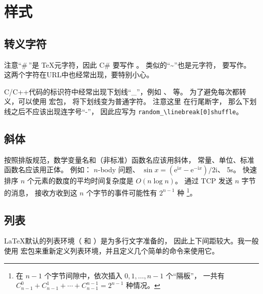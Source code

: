\chapter{样式}

\section{转义字符}
注意“\#\,”是 \TeX 元字符，因此 C\# 要写作 。
类似的“\textasciitilde”也是元字符，
要写作。
这两个字符在URL中也经常出现，要特别小心。

C/C++代码的标识符中经常出现下划线“_”，例如 、
 等。
为了避免每次都转义，可以使用  宏包，
将下划线变为普通字符。
注意这里  在行尾断字，
那么下划线之后不应该出现连字号“-”，
因此应写为 \verb|random_\linebreak[0]shuffle|。

\section{斜体}
按照排版规范，数学变量名和（非标准）函数名应该用斜体，
常量、单位、标准函数名应该用正体。
例如：%
$n$-body 问题、%
$\sin x = (\mathrm{e}^{\mathrm{i}x} - \mathrm{e}^{-\mathrm{i}x})/2\mathrm{i}$、
5\textmu s。
快速排序 $n$ 个元素的数度的平均时间复杂度是 $O(n \log n)$。
通过 TCP 发送 $n$ 字节的消息，
接收方收到这 $n$ 个字节的事件可能性有 $2^{n-1}$ 种
\footnote{在 $n-1$ 个字节间隙中，依次插入 $0, 1, \ldots, n-1$ 个“隔板”，
一共有 $C_{n-1}^0 + C_{n-1}^1 + \cdots + C_{n-1}^{n-1} = 2 ^ {n-1} $ 种情况。}。

\section{列表}
\LaTeX 默认的列表环境（ 和 ）是为多行文字准备的，
因此上下间距较大。我一般使用  宏包来重新定义列表环境，并且定义几个简单的命令来使用它。
\begin{Code}
\newcommand\begindot{\begin{itemize}
[itemsep=2pt plus 2pt minus 2pt,%
topsep=3pt plus 2pt minus 2pt,%
parsep=0pt plus 2pt minus 2pt]}
\newcommand\myenddot{\end{itemize}}
\end{Code}


